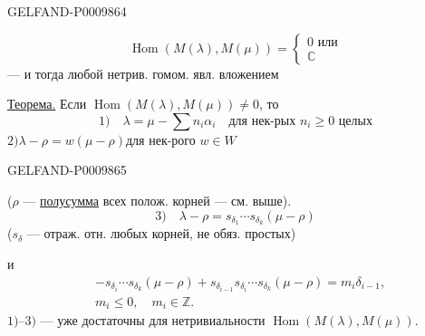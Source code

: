 \begin{GelfandAdjacentEvidence}{GELFAND-P000986}{4}


\[
\operatorname{Hom}(M(\lambda),M(\mu))=
\begin{cases}0\text{ или}\\\mathbb C\end{cases}
\]
--- и тогда любой нетрив. гомом. явл. вложением

\underline{Теорема.} Если $\operatorname{Hom}(M(\lambda),M(\mu))\ne0$, то
\[
1)\quad\lambda=\mu-\sum n_i\alpha_i
\quad\text{для нек-рых $n_i\ge0$ целых}
\]
$2)$\quad $\lambda-\rho=w(\mu-\rho)$\quad для нек-рого $w\in W$

\end{GelfandAdjacentEvidence}
\begin{GelfandAdjacentEvidence}{GELFAND-P000986}{5}


($\rho$ --- \underline{полусумма} всех полож. корней --- см. выше).
\[
3)\quad\lambda-\rho=s_{\delta_1}\cdots s_{\delta_k}(\mu-\rho)
\]
($s_\delta$ --- отраж. отн. любых корней, не обяз. простых)

и
\[
\begin{aligned}
&-s_{\delta_i}\cdots s_{\delta_k}(\mu-\rho)
+s_{\delta_{i-1}}s_{\delta_i}\cdots s_{\delta_k}(\mu-\rho)
=m_i\delta_{i-1},\\
&m_i\le0,\quad m_i\in\mathbb Z.
\end{aligned}
\]
$1)$–$3)$ --- уже достаточны для нетривиальности $\operatorname{Hom}(M(\lambda),M(\mu))$.

\end{GelfandAdjacentEvidence}



